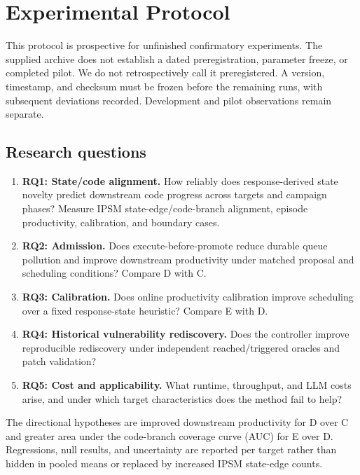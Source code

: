 \documentclass[final,5p,times,number]{elsarticle}
\begin{document}
\section{Experimental Protocol}
\label{sec:protocol}
This protocol is prospective for unfinished confirmatory experiments. The supplied archive does not establish a dated preregistration, parameter freeze, or completed pilot. We do not retrospectively call it preregistered. A version, timestamp, and checksum must be frozen before the remaining runs, with subsequent deviations recorded. Development and pilot observations remain separate.

\subsection{Research questions}
\begin{enumerate}
\item \textbf{RQ1: State/code alignment.} How reliably does response-derived state novelty predict downstream code progress across targets and campaign phases? Measure IPSM state-edge/code-branch alignment, episode productivity, calibration, and boundary cases.
\item \textbf{RQ2: Admission.} Does execute-before-promote reduce durable queue pollution and improve downstream productivity under matched proposal and scheduling conditions? Compare D with C.
\item \textbf{RQ3: Calibration.} Does online productivity calibration improve scheduling over a fixed response-state heuristic? Compare E with D.
\item \textbf{RQ4: Historical vulnerability rediscovery.} Does the controller improve reproducible rediscovery under independent reached/triggered oracles and patch validation?
\item \textbf{RQ5: Cost and applicability.} What runtime, throughput, and LLM costs arise, and under which target characteristics does the method fail to help?
\end{enumerate}
The directional hypotheses are improved downstream productivity for D over C and greater area under the code-branch coverage curve (AUC) for E over D. Regressions, null results, and uncertainty are reported per target rather than hidden in pooled means or replaced by increased IPSM state-edge counts.
\end{document}
